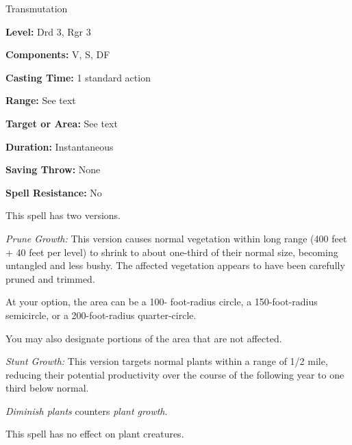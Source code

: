 
Transmutation

\textbf{Level:} Drd 3, Rgr 3

\textbf{Components:} V, S, DF

\textbf{Casting Time:} 1 standard action

\textbf{Range:} See text

\textbf{Target or Area:} See text

\textbf{Duration:} Instantaneous

\textbf{Saving Throw:} None

\textbf{Spell Resistance:} No

This spell has two versions.

\textit{Prune Growth:} This version causes normal vegetation within long range 
(400 feet + 40 feet per level) to shrink to about one-third of their normal size, 
becoming untangled and less bushy. The affected vegetation appears to have been 
carefully pruned and trimmed.

At your option, the area can be a 100- foot-radius circle, a 150-foot-radius semicircle, 
or a 200-foot-radius quarter-circle.

You may also designate portions of the area that are not affected.

\textit{Stunt Growth:} This version targets normal plants within a range of 1/2 
mile, reducing their potential productivity over the course of the following year 
to one third below normal.

\textit{Diminish plants} counters \textit{plant growth}.

This spell has no effect on plant creatures.

